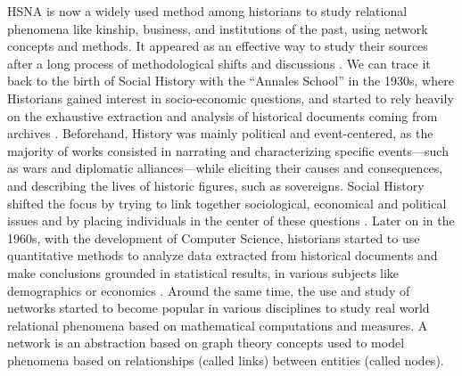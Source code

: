 HSNA is now a widely used method among historians to study relational phenomena like kinship, business, and institutions of the past, using network concepts and methods.
It appeared as an effective way to study their sources after a long process of methodological shifts and discussions \cite{cristofoliAuxSourcesGrands2008}.
We can trace it back to the birth of Social History with the ``Annales School'' in the 1930s, where Historians gained interest in socio-economic questions, and started to rely heavily on the exhaustive extraction and analysis of historical documents coming from archives \cite{blochApologiePourHistoire1949}.
Beforehand, History was mainly political and event-centered, as the majority of works consisted in narrating and characterizing specific events---such as wars and diplomatic alliances---while eliciting their causes and consequences, and describing the lives of historic figures, such as sovereigns.
Social History shifted the focus by trying to link together sociological, economical and political issues and by placing individuals in the center of these questions \cite{prost2014}.
Later on in the 1960s, with the development of Computer Science, historians started to use quantitative methods to analyze data extracted from historical documents and make conclusions grounded in statistical results, in various subjects like demographics \cite{henryRegistresParoissiauxHistoire1956} or economics \cite{goldinCliometricsNobel1995}.
Around the same time, the use and study of networks started to become popular in various disciplines to study real world relational phenomena based on mathematical computations and measures.
A network is an abstraction based on graph theory concepts used to model phenomena based on relationships (called links) between entities (called nodes).

